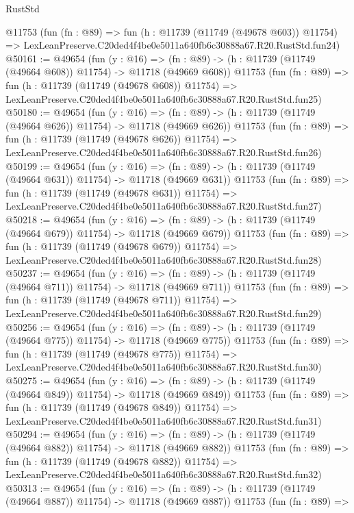 \begin{lexlean}{RustStd}
\begin{coremodule}
    @11753
    (fun (fn : @89) =>
    fun (h : @11739 (@11749 (@49678 @603)) @11754) =>
    LexLeanPreserve.C20ded4f4be0e5011a640fb6c30888a67.R20.RustStd.fun24)
@50161 := @49654
    (fun (y : @16) =>
    (fn : @89) -> (h : @11739 (@11749 (@49664 @608)) @11754) -> @11718 (@49669 @608))
    @11753
    (fun (fn : @89) =>
    fun (h : @11739 (@11749 (@49678 @608)) @11754) =>
    LexLeanPreserve.C20ded4f4be0e5011a640fb6c30888a67.R20.RustStd.fun25)
@50180 := @49654
    (fun (y : @16) =>
    (fn : @89) -> (h : @11739 (@11749 (@49664 @626)) @11754) -> @11718 (@49669 @626))
    @11753
    (fun (fn : @89) =>
    fun (h : @11739 (@11749 (@49678 @626)) @11754) =>
    LexLeanPreserve.C20ded4f4be0e5011a640fb6c30888a67.R20.RustStd.fun26)
@50199 := @49654
    (fun (y : @16) =>
    (fn : @89) -> (h : @11739 (@11749 (@49664 @631)) @11754) -> @11718 (@49669 @631))
    @11753
    (fun (fn : @89) =>
    fun (h : @11739 (@11749 (@49678 @631)) @11754) =>
    LexLeanPreserve.C20ded4f4be0e5011a640fb6c30888a67.R20.RustStd.fun27)
@50218 := @49654
    (fun (y : @16) =>
    (fn : @89) -> (h : @11739 (@11749 (@49664 @679)) @11754) -> @11718 (@49669 @679))
    @11753
    (fun (fn : @89) =>
    fun (h : @11739 (@11749 (@49678 @679)) @11754) =>
    LexLeanPreserve.C20ded4f4be0e5011a640fb6c30888a67.R20.RustStd.fun28)
@50237 := @49654
    (fun (y : @16) =>
    (fn : @89) -> (h : @11739 (@11749 (@49664 @711)) @11754) -> @11718 (@49669 @711))
    @11753
    (fun (fn : @89) =>
    fun (h : @11739 (@11749 (@49678 @711)) @11754) =>
    LexLeanPreserve.C20ded4f4be0e5011a640fb6c30888a67.R20.RustStd.fun29)
@50256 := @49654
    (fun (y : @16) =>
    (fn : @89) -> (h : @11739 (@11749 (@49664 @775)) @11754) -> @11718 (@49669 @775))
    @11753
    (fun (fn : @89) =>
    fun (h : @11739 (@11749 (@49678 @775)) @11754) =>
    LexLeanPreserve.C20ded4f4be0e5011a640fb6c30888a67.R20.RustStd.fun30)
@50275 := @49654
    (fun (y : @16) =>
    (fn : @89) -> (h : @11739 (@11749 (@49664 @849)) @11754) -> @11718 (@49669 @849))
    @11753
    (fun (fn : @89) =>
    fun (h : @11739 (@11749 (@49678 @849)) @11754) =>
    LexLeanPreserve.C20ded4f4be0e5011a640fb6c30888a67.R20.RustStd.fun31)
@50294 := @49654
    (fun (y : @16) =>
    (fn : @89) -> (h : @11739 (@11749 (@49664 @882)) @11754) -> @11718 (@49669 @882))
    @11753
    (fun (fn : @89) =>
    fun (h : @11739 (@11749 (@49678 @882)) @11754) =>
    LexLeanPreserve.C20ded4f4be0e5011a640fb6c30888a67.R20.RustStd.fun32)
@50313 := @49654
    (fun (y : @16) =>
    (fn : @89) -> (h : @11739 (@11749 (@49664 @887)) @11754) -> @11718 (@49669 @887))
    @11753
    (fun (fn : @89) =>

\end{coremodule}
\end{lexlean}
